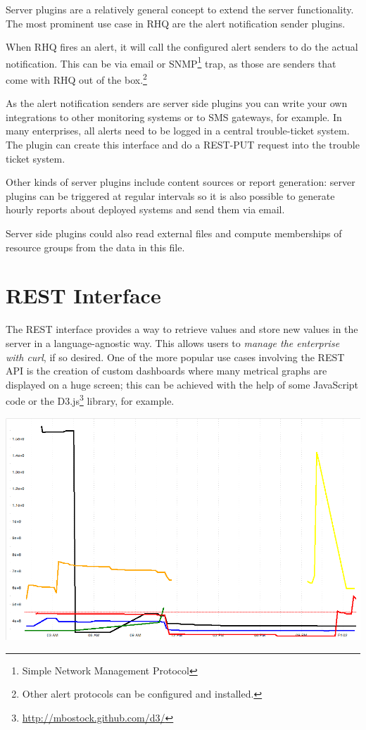 \documentclass[twocolumn,10pt,a4paper]{article}
\begin{document}
Server plugins are a relatively general concept to extend the server functionality. The most prominent use case in RHQ are the alert notification sender plugins. 

When RHQ fires an alert, it will call the configured alert senders to do the actual notification. This can be via email or SNMP\footnote{Simple Network Management Protocol} trap, as those are senders that come with RHQ out of the box.\footnote{Other alert protocols can be configured and installed.}

As the alert notification senders are server side plugins you can write your own integrations to other monitoring systems or to SMS gateways, for example. In many enterprises, all alerts need to be logged in a central trouble-ticket system. The plugin can create this interface and do a REST-PUT request into the trouble ticket system.

Other kinds of server plugins include content sources or report generation: server plugins can be triggered at regular intervals so it is also possible to generate hourly reports about deployed systems and send them via email. 

Server side plugins could also read external files and compute memberships of resource groups from the data in this file.

\section{REST Interface}

The REST interface provides a way to retrieve values and store 
new values in the server in a language-agnostic way.
This allows users to \emph{manage the enterprise with curl}, if so desired. 
One of the more
popular use cases involving the REST API is the creation of custom dashboards where many metrical
graphs are displayed on a huge screen; this can be achieved with the help
of some JavaScript code or the D3.js\footnote{\url{http://mbostock.github.com/d3/}} library, for example.

\noindent\includegraphics[width=\columnwidth]{graph/multigraph.png}
\end{document}

